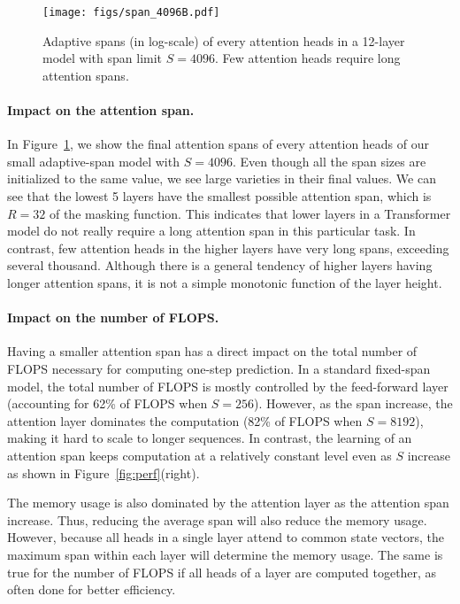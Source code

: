 \documentclass[11pt,a4paper]{article}
\newcommand{\fig}[1]{Figure~\ref{fig:#1}}
\begin{document}
\begin{figure}
\centering
\texttt{[image: figs/span\_4096B.pdf]} \\
\caption{
Adaptive spans (in log-scale) of every attention heads in a 12-layer model with span limit $S=4096$. Few attention heads require long attention spans.}
\vspace{-4mm}
\label{fig:span4096}
\end{figure}

\paragraph{Impact on the attention span.}
In \fig{span4096}, we show the final attention spans of every attention heads of our small adaptive-span model with $S=4096$.
Even though all the span sizes are initialized to the same value, we see large varieties in their final values.
We can see that the lowest 5 layers have the smallest possible attention span, which is $R=32$ of the masking function.
This indicates that lower layers in a Transformer model do not really require a long attention span in this particular task.
In contrast, few attention heads in the higher layers have very long spans, exceeding several thousand.
Although there is a general tendency of higher layers having longer attention spans, it is not a simple monotonic function of the layer height.


\paragraph{Impact on the number of FLOPS.}
Having a smaller attention span has a direct impact on the total number of FLOPS necessary for computing one-step prediction.
In a standard fixed-span model, the total number of FLOPS is mostly controlled by the feed-forward layer (accounting for 62\% of FLOPS when $S=256$). However, as the span increase, the attention layer dominates the computation (82\% of FLOPS when $S=8192$), making it hard to scale to longer sequences. In contrast, the learning of an attention span keeps computation at a relatively constant level even as $S$ increase as shown in \fig{perf}(right).

The memory usage is also dominated by the attention layer as the attention span increase. Thus, reducing the average span will also reduce the memory usage. However, because all heads in a single layer attend to common state vectors, the maximum span within each layer will determine the memory usage. The same is true for the number of FLOPS if all heads of a layer are computed together, as often done for better efficiency.
\end{document}
